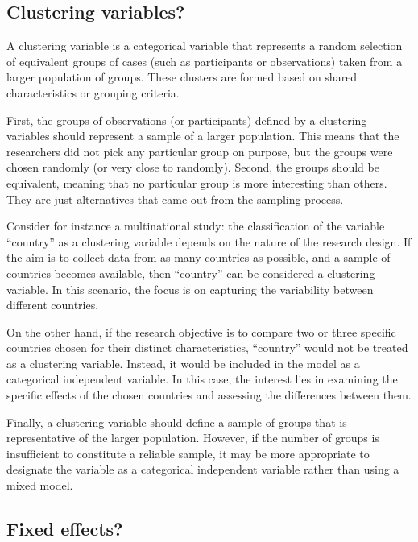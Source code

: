 \documentclass[
]{book}
\begin{document}
\hypertarget{clustering-variables}{%
\subsection{Clustering variables?}\label{clustering-variables}}

A clustering variable is a categorical variable that represents a random selection of equivalent groups of cases (such as participants or observations) taken from a larger population of groups. These clusters are formed based on shared characteristics or grouping criteria.

First, the groups of observations (or participants) defined by a clustering variables should represent a sample of a larger population. This means that the researchers did not pick any particular group on purpose, but the groups were chosen randomly (or very close to randomly). Second, the groups should be equivalent, meaning that no particular group is more interesting than others. They are just alternatives that came out from the sampling process.

Consider for instance a multinational study: the classification of the variable ``country'' as a clustering variable depends on the nature of the research design. If the aim is to collect data from as many countries as possible, and a sample of countries becomes available, then ``country'' can be considered a clustering variable. In this scenario, the focus is on capturing the variability between different countries.

On the other hand, if the research objective is to compare two or three specific countries chosen for their distinct characteristics, ``country'' would not be treated as a clustering variable. Instead, it would be included in the model as a categorical independent variable. In this case, the interest lies in examining the specific effects of the chosen countries and assessing the differences between them.

Finally, a clustering variable should define a sample of groups that is representative of the larger population. However, if the number of groups is insufficient to constitute a reliable sample, it may be more appropriate to designate the variable as a categorical independent variable rather than using a mixed model.

\hypertarget{fixed-effects}{%
\subsection{Fixed effects?}\label{fixed-effects}}
\end{document}
